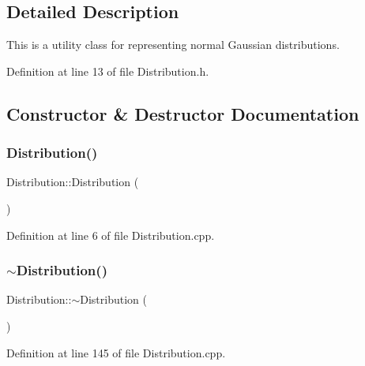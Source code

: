\subsection{Detailed Description}
This is a utility class for representing normal Gaussian distributions. 

Definition at line 13 of file Distribution.\+h.



\subsection{Constructor \& Destructor Documentation}
\mbox{\label{class_world_architect_1_1_distribution_ada837c9a1da728290d6bbea0bb6b266f}} 
\subsubsection{\texorpdfstring{Distribution()}{Distribution()}\hspace{0.1cm}{\footnotesize\ttfamily [1/2]}}
{\footnotesize\ttfamily Distribution\+::\+Distribution (\begin{DoxyParamCaption}{ }\end{DoxyParamCaption})}



Definition at line 6 of file Distribution.\+cpp.

\mbox{\label{class_world_architect_1_1_distribution_a68522687bdcca605cce35adb68afdcac}} 
\subsubsection{\texorpdfstring{$\sim$Distribution()}{~Distribution()}}
{\footnotesize\ttfamily Distribution\+::$\sim$\+Distribution (\begin{DoxyParamCaption}{ }\end{DoxyParamCaption})}



Definition at line 145 of file Distribution.\+cpp.

